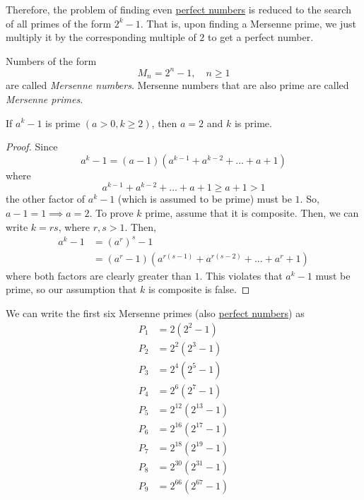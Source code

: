 \documentclass{article}
\newcounter{definition}[section]
\begin{document}
Therefore, the problem of finding even \hyperref[def:perfect-number]{perfect numbers} is reduced to the search of all primes of the form $2^k - 1$. That is, upon finding a Mersenne prime, we just multiply it by the corresponding multiple of $2$ to get a perfect number. 

\begin{definition}
  \label{def:mersenne-numbers}
Numbers of the form 
\begin{equation}
  M_n = 2^n - 1, \quad n \geq 1
\end{equation}
are called \textit{Mersenne numbers}. Mersenne numbers that are also prime are called \textit{Mersenne primes}. 
\end{definition}

\begin{lemma}
  \label{thm:necessary-conditions-for-ak1-to-be-prime}
If $a^k - 1$ is prime $(a>0, k \geq 2)$, then $a = 2$ and $k$ is prime. 
\end{lemma}
\begin{proof}
Since
\begin{equation}
  a^k - 1 = (a-1)(a^{k-1} + a^{k-2} + ... + a + 1)
\end{equation}
where
\begin{equation}
  a^{k-1} + a^{k-2} + ... + a + 1 \geq a + 1 > 1
\end{equation}
the other factor of $a^k -1$ (which is assumed to be prime) must be $1$. So, $a-1 = 1 \implies a = 2$. To prove $k$ prime, assume that it is composite. Then, we can write $k = rs$, where $r, s > 1$. Then, 
\begin{align*}
    a^k - 1 & = (a^r)^s - 1 \\
    & = (a^r - 1) (a^{r(s-1)} + a^{r(s-2)} + ... + a^r + 1)
\end{align*}
where both factors are clearly greater than $1$. This violates that $a^k -1$ must be prime, so our assumption that $k$ is composite is false. 
\end{proof}

We can write the first six Mersenne primes (also \hyperref[def:perfect-number]{perfect numbers}) as 
\begin{align*}
    P_1 & = 2(2^2 -1) \\
    P_2 & = 2^2 (2^3 - 1) \\
    P_3 & = 2^4 (2^5 - 1) \\
    P_4 & = 2^6 (2^7 - 1) \\
    P_5 & = 2^{12} (2^{13} - 1) \\
    P_6 & = 2^{16} (2^{17} - 1) \\
    P_7 & = 2^{18} (2^{19} - 1) \\
    P_8 & = 2^{30} (2^{31} - 1) \\
    P_9 & = 2^{66} (2^{67} - 1) 
\end{align*}
\end{document}
